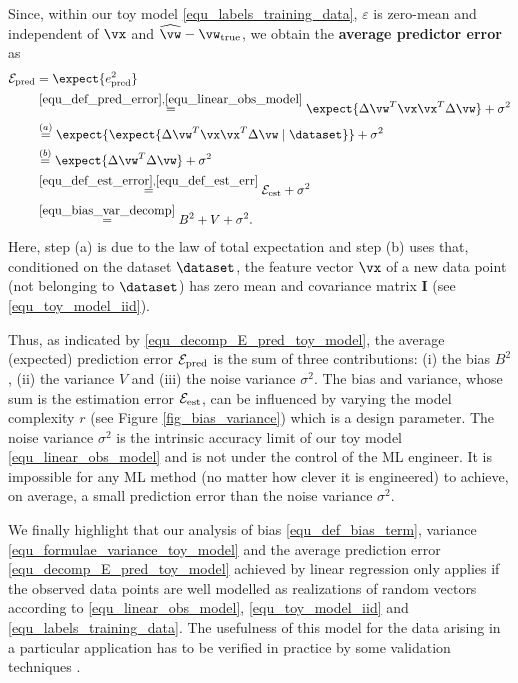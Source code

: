 \documentclass[12pt]{report}
\begin{document}
Since, within our toy model \eqref{equ_labels_training_data}, $\varepsilon$ is zero-mean and independent of 
$\vx$ and $\widehat{\vw} - \vw_{\rm true}$, we obtain the {\bf average predictor error} as 
\begin{align} 
\label{equ_decomp_E_pred_toy_model}
\mathcal{E}_{\rm pred} & = \expect \{ e_{\rm pred}^{2} \} \nonumber \\
& \stackrel{\eqref{equ_def_pred_error},\eqref{equ_linear_obs_model}}{=} \expect \{ \Delta \vw^{T} \vx \vx^{T} \Delta \vw \} + \sigma^{2}   \nonumber \\
& \stackrel{(a)}{=} \expect \{ \expect \{ \Delta \vw^{T} \vx \vx^{T} \Delta \vw \mid \dataset \} \} + \sigma^{2}  \nonumber \\
& \stackrel{(b)}{=} \expect \{ \Delta \vw^{T} \Delta \vw \}  + \sigma^{2}  \nonumber \\
& \stackrel{\eqref{equ_def_est_error},\eqref{equ_def_est_err}}{=} \mathcal{E}_{\rm est} + \sigma^{2} \nonumber \\
& \stackrel{\eqref{equ_bias_var_decomp}}{=} B^{2} + V + \sigma^{2}. 
\end{align} 
Here, step (a) is due to the law of total expectation \cite{BillingsleyProbMeasure} and step (b) uses that, 
conditioned on the dataset $\dataset$, the feature vector $\vx$ of a new data point (not belonging to 
$\dataset$) has zero mean and covariance matrix $\mathbf{I}$ (see \eqref{equ_toy_model_iid}). 

Thus, as indicated by \eqref{equ_decomp_E_pred_toy_model}, the average (expected) prediction 
error $\mathcal{E}_{\rm pred}$ is the sum of three contributions: (i) the bias $B^{2}$, (ii) the variance 
$V$ and (iii) the noise variance $\sigma^{2}$. The bias and variance, whose sum is the estimation 
error $\mathcal{E}_{\rm est}$, can be influenced by varying the model complexity $r$ (see Figure \ref{fig_bias_variance}) 
which is a design parameter. The noise variance $\sigma^{2}$ is the intrinsic accuracy limit of our toy 
model \eqref{equ_linear_obs_model} and is not under the control of the ML engineer. It is impossible for 
any ML method (no matter how clever it is engineered) to achieve, on average, a small prediction error 
than the noise variance $\sigma^{2}$. 

We finally highlight that our analysis of bias \eqref{equ_def_bias_term}, variance \eqref{equ_formulae_variance_toy_model} 
and the average prediction error \eqref{equ_decomp_E_pred_toy_model} achieved by linear regression only 
applies if the observed data points are well modelled as realizations of random vectors according to 
\eqref{equ_linear_obs_model}, \eqref{equ_toy_model_iid} and \eqref{equ_labels_training_data}. The 
usefulness of this model for the data arising in a particular application has to be verified in practice by 
some validation techniques \cite{Young93,Vasicek76}. 
\end{document}
